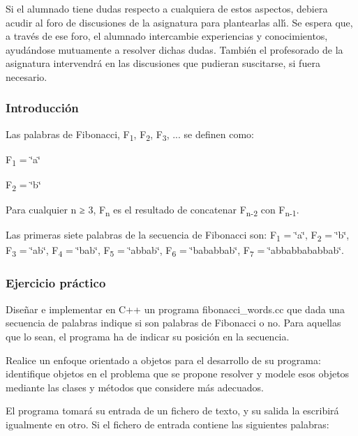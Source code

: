 Si el alumnado tiene dudas respecto a cualquiera de estos aspectos, debiera acudir al foro de discusiones de la asignatura para plantearlas allı́. Se espera que, a través de ese foro, el alumnado intercambie experiencias y conocimientos, ayudándose mutuamente a resolver dichas dudas. También el profesorado de la asignatura intervendrá en las discusiones que pudieran suscitarse, si fuera necesario.

\subsubsection*{Introducción}

Las palabras de Fibonacci, F\textsubscript{1}, F\textsubscript{2}, F\textsubscript{3}, ... se definen como\+:
\begin{DoxyItemize}
\item F\textsubscript{1} = \char`\"{}a\char`\"{}
\item F\textsubscript{2} = \char`\"{}b\char`\"{}
\item Para cualquier n ≥ 3, F\textsubscript{n} es el resultado de concatenar F\textsubscript{n-\/2} con F\textsubscript{n-\/1}.
\end{DoxyItemize}

Las primeras siete palabras de la secuencia de Fibonacci son\+: F\textsubscript{1} = \char`\"{}a\char`\"{}, F\textsubscript{2} = \char`\"{}b\char`\"{}, F\textsubscript{3} = \char`\"{}ab\char`\"{}, F\textsubscript{4} = \char`\"{}bab\char`\"{}, F\textsubscript{5} = \char`\"{}abbab\char`\"{}, F\textsubscript{6} = \char`\"{}bababbab\char`\"{}, F\textsubscript{7} = \char`\"{}abbabbababbab\char`\"{}.

\subsubsection*{Ejercicio práctico}

Diseñar e implementar en C++ un programa {\ttfamily fibonacci\+\_\+words.\+cc} que dada una secuencia de palabras indique si son palabras de Fibonacci o no. Para aquellas que lo sean, el programa ha de indicar su posición en la secuencia.

Realice un enfoque orientado a objetos para el desarrollo de su programa\+: identifique objetos en el problema que se propone resolver y modele esos objetos mediante las clases y métodos que considere más adecuados.

El programa tomará su entrada de un fichero de texto, y su salida la escribirá igualmente en otro. Si el fichero de entrada contiene las siguientes palabras\+:



